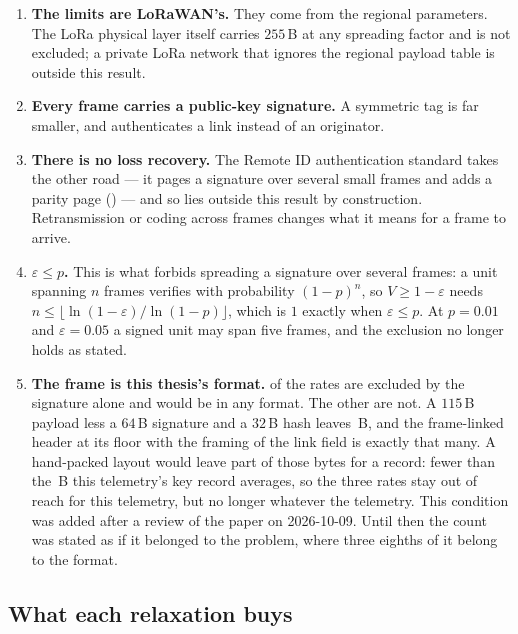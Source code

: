 \begin{enumerate}
\item \textbf{The limits are LoRaWAN's.} They come from the regional parameters. The LoRa
      physical layer itself carries $255$\,B at any spreading factor and is not excluded; a
      private LoRa network that ignores the regional payload table is outside this result.
\item \textbf{Every frame carries a public-key signature.} A symmetric tag is far smaller, and
      authenticates a link instead of an originator.
\item \textbf{There is no loss recovery.} The Remote ID authentication standard takes the
      other road --- it pages a signature over several small frames and adds a parity page
      () --- and so lies outside this result by construction.
      Retransmission or coding across frames changes what it
      means for a frame to arrive.
\item \textbf{$\varepsilon \leq p$.} This is what forbids spreading a signature over several
      frames: a unit spanning $n$ frames verifies with probability $(1-p)^n$, so
      $V \geq 1-\varepsilon$ needs $n \leq \lfloor \ln(1-\varepsilon)/\ln(1-p) \rfloor$, which is
      $1$ exactly when $\varepsilon \leq p$. At $p = 0.01$ and $\varepsilon = 0.05$ a signed unit
      may span five frames, and the exclusion no longer holds as stated.
\item \textbf{The frame is this thesis's format.} \exclSigCountCap{} of the \exclCount{} rates
      are excluded by the signature alone and would be in any format. The other
      \exclFmtCount{} are not. A $115$\,B payload less a $64$\,B signature and a $32$\,B hash
      leaves \exRoomAfterCrypto\,B, and the frame-linked header at its floor with the framing of the
      link field is exactly that many. A hand-packed layout would leave part of those bytes for
      a record: fewer than the \keyLean\,B this telemetry's key record averages, so the three
      rates stay out of reach for this telemetry, but no longer whatever the telemetry. This
      condition was added after a review of the paper on 2026-10-09. Until then the count was
      stated as if it belonged to the problem, where three eighths of it belong to the format.
\end{enumerate}

\subsection{What each relaxation buys}

